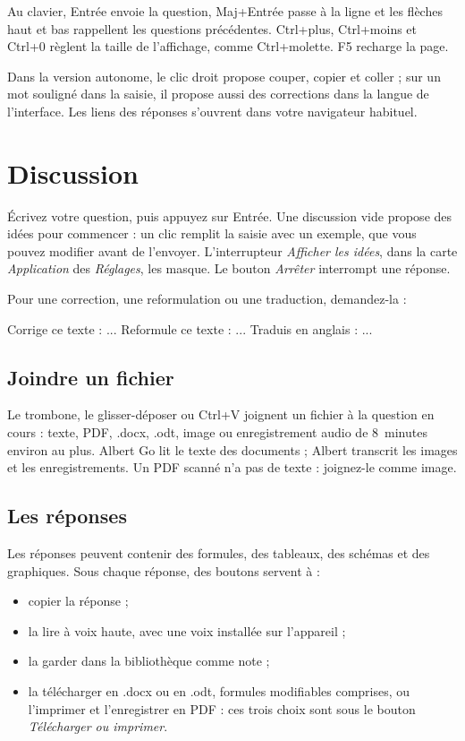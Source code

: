 \documentclass[a4paper, 11pt]{article}
\begin{document}
Au clavier, Entrée envoie la question, Maj+Entrée passe à la ligne et les flèches haut et bas rappellent les questions précédentes. Ctrl+plus, Ctrl+moins et Ctrl+0 règlent la taille de l'affichage, comme Ctrl+molette. F5 recharge la page.

Dans la version autonome, le clic droit propose couper, copier et coller ; sur un mot souligné dans la saisie, il propose aussi des corrections dans la langue de l'interface. Les liens des réponses s'ouvrent dans votre navigateur habituel.

\section{Discussion}
\label{sec:discussion}

Écrivez votre question, puis appuyez sur Entrée. Une discussion vide propose des idées pour commencer : un clic remplit la saisie avec un exemple, que vous pouvez modifier avant de l'envoyer. L'interrupteur \emph{Afficher les idées}, dans la carte \emph{Application} des \emph{Réglages}, les masque. Le bouton \emph{Arrêter} interrompt une réponse.

Pour une correction, une reformulation ou une traduction, demandez-la :
\begin{plain_code}
Corrige ce texte : ...
Reformule ce texte : ...
Traduis en anglais : ...
\end{plain_code}

\subsection{Joindre un fichier}

Le trombone, le glisser-déposer ou Ctrl+V joignent un fichier à la question en cours : texte, PDF, .docx, .odt, image ou enregistrement audio de 8~minutes environ au plus. Albert Go lit le texte des documents ; Albert transcrit les images et les enregistrements. Un PDF scanné n'a pas de texte : joignez-le comme image.

\subsection{Les réponses}

Les réponses peuvent contenir des formules, des tableaux, des schémas et des graphiques. Sous chaque réponse, des boutons servent à :
\begin{itemize}
  \item copier la réponse ;
  \item la lire à voix haute, avec une voix installée sur l'appareil ;
  \item la garder dans la bibliothèque comme note ;
  \item la télécharger en .docx ou en .odt, formules modifiables comprises, ou l'imprimer et l'enregistrer en PDF : ces trois choix sont sous le bouton \emph{Télécharger ou imprimer}.
\end{itemize}
\end{document}
